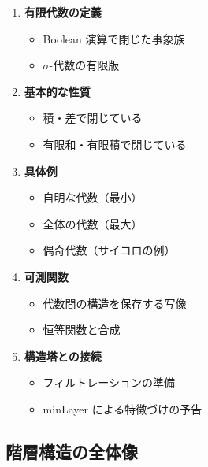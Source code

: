 \documentclass[12pt,a4paper,ja=standard]{bxjsarticle}
\theoremstyle{definition}
\begin{document}
\begin{enumerate}
    \item \textbf{有限代数の定義}
    \begin{itemize}
        \item Boolean 演算で閉じた事象族
        \item $\sigma$-代数の有限版
    \end{itemize}
    
    \item \textbf{基本的な性質}
    \begin{itemize}
        \item 積・差で閉じている
        \item 有限和・有限積で閉じている
    \end{itemize}
    
    \item \textbf{具体例}
    \begin{itemize}
        \item 自明な代数（最小）
        \item 全体の代数（最大）
        \item 偶奇代数（サイコロの例）
    \end{itemize}
    
    \item \textbf{可測関数}
    \begin{itemize}
        \item 代数間の構造を保存する写像
        \item 恒等関数と合成
    \end{itemize}
    
    \item \textbf{構造塔との接続}
    \begin{itemize}
        \item フィルトレーションの準備
        \item minLayer による特徴づけの予告
    \end{itemize}
\end{enumerate}

\subsection{階層構造の全体像}
\end{document}
